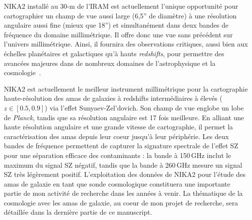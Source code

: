 NIKA2 installé au 30-m de l'IRAM est actuellement l'unique opportunité
pour cartographier un champ de vue aussi large (6,5'' de diamètre) à
une résolution angulaire aussi fine (mieux que 18'') et simultanément
dans deux bandes de fréquence du domaine millimétrique. Il offre donc
une vue sans précédent sur l'univers millimétrique. Ainsi, il fournira
des observations critiques, aussi bien aux échelles planétaires et
galactiques qu'à hauts \emph{redshifts}, pour permettre des avancées
majeures dans de nombreux domaines de l'astrophysique et la
cosmologie~\citep[e.g.]{Rigby2018, Bracco2017, Bethermin2017, Mancuso2016,
  Ruppin2019a}.


NIKA2 est actuellement le meilleur instrument millimétrique pour la cartographie
haute-résolution des amas de galaxies à redshifts intermédiaires à
élevés ($z\in[0.5, 0.9]$) via l'effet Sunyaev-Zel'dovich. Son champ de
vue englobe un lobe de \emph{Planck}, tandis que sa résolution
angulaire est 17 fois meilleure. En alliant une haute résolution
angulaire et une grande vitesse de cartographie, il permet la
caractérisation des amas depuis leur coeur jusqu'à leur
périphérie. Les deux bandes de fréquence permettent de capturer
la signature spectrale de l'effet SZ pour une séparation
efficace des contaminants : la bande à 150\,GHz inclut le
maximum du signal SZ négatif, tandis que la bande à 260\,GHz mesure un
signal SZ très légèrement positif. L'exploitation des données de NIKA2
pour l'étude des amas de galaxie en tant que sonde cosmologique
constituera une importante partie de mon activité de recherche dans les
années à venir. La thématique de la cosmologie avec les amas de
galaxie, au coeur de mon projet de recherche, sera détaillée dans la
dernière partie de ce manuscript.

